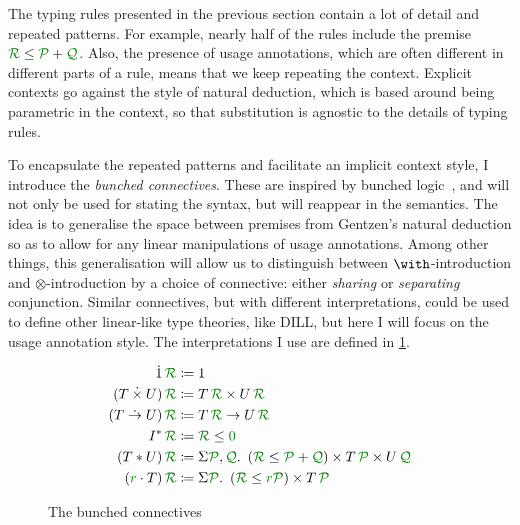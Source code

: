 
The typing rules presented in the previous section contain a lot of detail and
repeated patterns.
For example, nearly half of the rules include the premise
$\grR \leq \grP + \grQ$.
Also, the presence of usage annotations, which are often different in different
parts of a rule, means that we keep repeating the context.
Explicit contexts go against the style of natural deduction, which is based
around being parametric in the context, so that substitution is agnostic to the
details of typing rules.

To encapsulate the repeated patterns and facilitate an implicit context style,
I introduce the \emph{bunched connectives}.
These are inspired by bunched logic~\cite{oHP99}, and will not only be used for
stating the syntax, but will reappear in the semantics.
The idea is to generalise the space between premises from Gentzen's natural
deduction so as to allow for any linear manipulations of usage annotations.
Among other things, this generalisation will allow us to distinguish between
$\with$-introduction and $\otimes$-introduction by a choice of connective:
either \emph{sharing} or \emph{separating} conjunction.
Similar connectives, but with different interpretations, could be used to
define other linear-like type theories, like DILL, but here I will focus on the
usage annotation style.
The interpretations I use are defined in \cref{fig:bunched}.

\begin{figure}
  \begin{align*}
    \dot1\,\grR &\coloneqq 1 \\
    (T \dottimes U)\,\grR &\coloneqq T\,\grR \times U\,\grR \\
    (T \dotto U)\,\grR &\coloneqq T\,\grR \to U\,\grR \\
    I^*\,\grR &\coloneqq \grR \leq \gr0 \\
    (T \sep U)\,\grR &\coloneqq \Sigma \grP,\grQ.~ \plr{\grR \leq \grP + \grQ}
                       \times T\,\grP \times U\,\grQ \\
    (\gr r \cdot T)\,\grR &\coloneqq \Sigma \grP.~ \plr{\grR \leq \gr r\grP}
                       \times T\,\grP
  \end{align*}
  \caption{The bunched connectives}
  \label{fig:bunched}
\end{figure}

